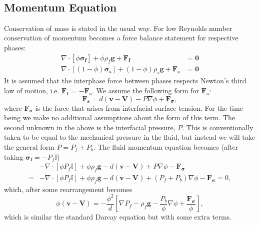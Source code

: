 \documentclass[9pt,fleqn,twoside]{article}
\theoremstyle{plain}
\theoremstyle{definition}
\theoremstyle{remark}
\begin{document}
{} \\
\noindent
\subsection{Momentum Equation}
Conservation of mass is stated in the usual way. For low Reynolds
number conservation of
momentum becomes a force balance statement for respective phases:
\begin{equation} 
\begin{split}
\nabla \cdot [\phi \mathbf{\sigma_f}] + \phi \rho_f \mathbf{g} +
\mathbf{F_f} &= \mathbf{0}  \\
 \nabla \cdot [(1 - \phi) \mathbf{\sigma_s}] + (1 - \phi) \rho_s \mathbf{g} +
\mathbf{F_s} &= \mathbf{0}
\end{split}
\end{equation}
It is assumed that the interphase force between phases respects
Newton's third law of motion, i.e. $\mathbf{F_f}$ =
$-\mathbf{F_s}$. We assume the following form for $\mathbf{F_s}$:
\begin{equation}
\mathbf{F_s} = d(\mathbf{v} - \mathbf{V}) - P \nabla \phi +
\mathbf{F_{\sigma}}, 
\end{equation}
where $\mathbf{F_{\sigma}}$ is the force that arises from interfacial
surface tension. For the time being we make no additional assumptions
about the form of this term. The second unknown in the above is the
interfacial pressure, $P$. This is conventionally taken to be equal to
the mechanical pressure in the fluid, but instead we will take the
general form $P = P_f + P_b$. The fluid momentum equation becomes
(after taking $\mathbf{\sigma_f} = -P_f\mathbb{I}$)
\begin{equation}
\begin{split}
&-\nabla \cdot [\phi P_f\mathbb{I}] + \phi \rho_f \mathbf{g} - d(\mathbf{v} - \mathbf{V}) + P \nabla \phi -
\mathbf{F_{\sigma}} \\
=&-\nabla \cdot [\phi P_f\mathbb{I}] + \phi \rho_f \mathbf{g} -
d(\mathbf{v} - \mathbf{V}) + (P_f + P_b) \nabla \phi -
\mathbf{F_{\sigma}} = 0,
\end{split}
\end{equation}
which, after some rearrangement becomes
\begin{equation}
\phi(\mathbf{v} - \mathbf{V}) = -\frac{\phi^2}{d} \left [ \nabla P_f -
  \rho_f \mathbf{g} - \frac{P_b}{\phi} \nabla \phi +
  \frac{\mathbf{F_{\sigma}}}{\phi} \right ],
\end{equation}
which is similar the standard Darcay equation but with some extra terms.
\end{document}
